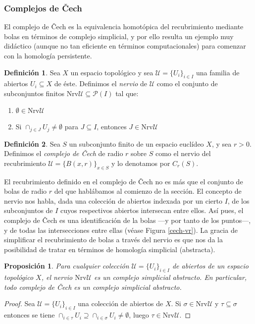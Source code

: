 \documentclass[12pt,a4paper,twoside]{article} %
\theoremstyle{plain}
\newtheorem{proposicion}{Proposición}[subsection]
\theoremstyle{definition}
\newtheorem{definicion}{Definición}[subsection]
\newcommand{\Nrv}{\mathrm{Nrv}}
\newcommand{\NrvU}{\mathrm{Nrv}\mathcal{U}}
\newcommand{\U}{\mathcal{U}}
\begin{document}
\subsubsection{Complejos de Čech}
El complejo de Čech es la equivalencia homotópica del recubrimiento mediante bolas en términos de complejo simplicial, y por ello resulta un ejemplo muy didáctico (aunque no tan eficiente en términos computacionales) para comenzar con la homología persistente.

\begin{definicion}
Sea $X$ un espacio topológico y sea $\mathcal{U} = \{ U_i \}_{i\in I}$ una familia de abiertos $U_i \subseteq X$ de éste. Definimos el \emph{nervio} de $\mathcal{U}$ como el conjunto de subconjuntos finitos $\Nrv \mathcal{U} \subseteq \mathcal{P}(I)$ tal que:
\begin{enumerate}
\item $\emptyset \in \Nrv \mathcal{U}$
\item Si $\cap_{j\in J} U_j \neq \emptyset$ para $J\subseteq I$, entonces $J\in \Nrv \mathcal{U}$
\end{enumerate}
\end{definicion}

\begin{definicion}
Sea $S$ un subconjunto finito de un espacio euclídeo $X$, y sea $r > 0$. Definimos el \emph{complejo de Čech} de radio $r$ sobre $S$ como el nervio del recubrimiento $\mathcal{U} = \{ B(x, r)\}_{x \in S}$ y lo denotamos por $C_r(S)$.
\end{definicion}

El recubrimiento definido en el complejo de Čech no es más que el conjunto de bolas de radio $r$ del que hablábamos al comienzo de la sección. El concepto de nervio nos habla, dada una colección de abiertos indexada por un cierto $I$, de los subconjuntos de $I$ cuyos respectivos abiertos intersecan entre ellos. Así pues, el complejo de Čech es una identificación de la bolas ---y por tanto de los puntos---, y de todas las intersecciones entre ellas (véase Figura \ref{cech-vr}). La gracia de simplificar el recubrimiento de bolas a través del nervio es que nos da la posibilidad de tratar en términos de homología simplicial (abstracta).

\begin{proposicion}
Para cualquier colección $\mathcal{U} = \{ U_i \}_{i\in I}$ de abiertos de un espacio topológico $X$, el nervio $\Nrv \mathcal{U}$ es un complejo simplicial abstracto. En particular, todo complejo de Čech es un complejo simplicial abstracto.
\end{proposicion}
\begin{proof}
Sea $\U = \{ U_i \}_{i\in I}$ una colección de abiertos de $X$. Si $\sigma \in \NrvU$ y $\tau \subseteq \sigma$ entonces se tiene $\cap_{i\in\tau} U_i \supseteq \cap_{i\in\sigma} U_i \neq \emptyset$, luego $\tau \in \NrvU$.
\end{proof}
\end{document}
